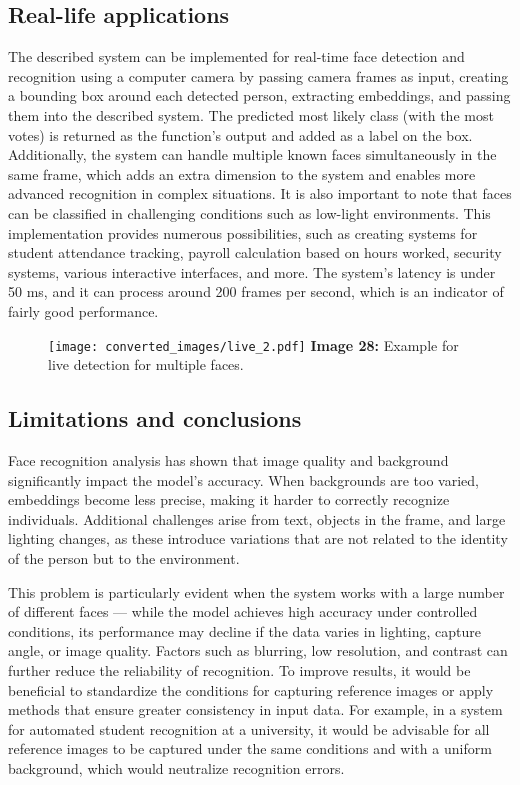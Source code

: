 \documentclass{article}
\begin{document}
\subsection*{Real-life applications}
\hspace*{1.00cm}The described system can be implemented for real-time face detection and recognition using a computer camera by passing camera frames as input, creating a bounding box around each detected person, extracting embeddings, and passing them into the described system. The predicted most likely class (with the most votes) is returned as the function's output and added as a label on the box. Additionally, the system can handle multiple known faces simultaneously in the same frame, which adds an extra dimension to the system and enables more advanced recognition in complex situations. It is also important to note that faces can be classified in challenging conditions such as low-light environments. This implementation provides numerous possibilities, such as creating systems for student attendance tracking, payroll calculation based on hours worked, security systems, various interactive interfaces, and more. The system's latency is under 50 ms, and it can process around 200 frames per second, which is an indicator of fairly good performance.
\begin{figure}[H]
    \centering
    \texttt{[image: converted\_images/live\_2.pdf]}
    \textbf{Image 28:} Example for live detection for multiple faces.
\end{figure}
\subsection*{Limitations and conclusions}
\hspace*{1.00cm}Face recognition analysis has shown that image quality and background significantly impact the model's accuracy. When backgrounds are too varied, embeddings become less precise, making it harder to correctly recognize individuals. Additional challenges arise from text, objects in the frame, and large lighting changes, as these introduce variations that are not related to the identity of the person but to the environment.

\hspace*{1.00cm}This problem is particularly evident when the system works with a large number of different faces — while the model achieves high accuracy under controlled conditions, its performance may decline if the data varies in lighting, capture angle, or image quality. Factors such as blurring, low resolution, and contrast can further reduce the reliability of recognition.
To improve results, it would be beneficial to standardize the conditions for capturing reference images or apply methods that ensure greater consistency in input data. For example, in a system for automated student recognition at a university, it would be advisable for all reference images to be captured under the same conditions and with a uniform background, which would neutralize recognition errors.
\end{document}
